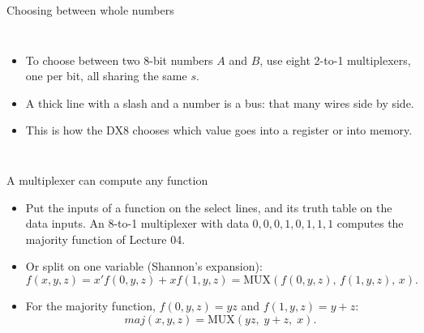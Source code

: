 \documentclass[10pt]{wosm-slides}
\newcommand*\buswidth[3][above]{%
  \draw[wire] ($(#2)+(-0.08,-0.12)$) -- ($(#2)+(0.08,0.12)$);
  \node[edgelabel, #1=2pt] at (#2) {#3};}
\begin{document}
\begin{frame}{Choosing between whole numbers}
  \begin{columns}[c, totalwidth=\textwidth]
      \centering
      \begin{itemize}
        \item To choose between two 8-bit numbers $A$ and $B$, use eight 2-to-1
          multiplexers, one per bit, all sharing the same $s$.
        \item A thick line with a slash and a number is a \alert{bus}: that many
          wires side by side.
        \item This is how the DX8 chooses which value goes into a register or into
          memory.
      \end{itemize}
  \end{columns}
\end{frame}

\begin{frame}{A multiplexer can compute any function}
  \begin{itemize}
    \item Put the inputs of a function on the select lines, and its truth table on
      the data inputs. An 8-to-1 multiplexer with data
      $0, 0, 0, 1, 0, 1, 1, 1$ computes the majority function of Lecture 04.
    \item Or split on one variable (Shannon's expansion):
      \[ f(x, y, z) = x' f(0, y, z) + x f(1, y, z)
                    = \mathrm{MUX}(f(0, y, z),\, f(1, y, z),\, x). \]
    \item For the majority function, $f(0, y, z) = yz$ and $f(1, y, z) = y + z$:
      \[ \mathit{maj}(x, y, z) = \mathrm{MUX}(yz,\; y + z,\; x). \]
  \end{itemize}

  \medskip
\end{frame}
\end{document}

